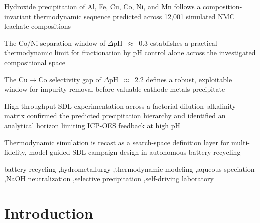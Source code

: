 \documentclass[final,2p,times]{elsarticle}
\begin{document}
\begin{frontmatter}
\begin{highlights}
\item Hydroxide precipitation of Al, Fe, Cu, Co, Ni, and Mn follows a composition-invariant thermodynamic sequence predicted across 12,001 simulated NMC leachate compositions
\item The Co/Ni separation window of $\Delta$pH~$\approx$~0.3 establishes a practical thermodynamic limit for fractionation by pH control alone across the investigated compositional space
\item The Cu$\to$Co selectivity gap of $\Delta$pH~$\approx$~2.2 defines a robust, exploitable window for impurity removal before valuable cathode metals precipitate
\item High-throughput SDL experimentation across a factorial dilution--alkalinity matrix confirmed the predicted precipitation hierarchy and identified an analytical horizon limiting ICP-OES feedback at high pH
\item Thermodynamic simulation is recast as a search-space definition layer for multi-fidelity, model-guided SDL campaign design in autonomous battery recycling
\end{highlights}

\begin{keyword}
battery recycling \sep hydrometallurgy \sep thermodynamic modeling \sep aqueous speciation \sep NaOH neutralization \sep selective precipitation \sep self-driving laboratory
\end{keyword}


\end{frontmatter}


\linenumbers

\section{Introduction}

\font=1.2pt%
\font=1pt%
\font=0.35pt%
\end{document}
